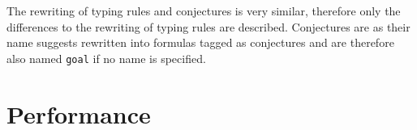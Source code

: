 The rewriting of typing rules and conjectures is very similar,
therefore only the differences to the rewriting of typing rules are
described. Conjectures are as their name suggests rewritten into
formulas tagged as conjectures and are therefore also named
\texttt{goal} if no name is specified. 

\section{Performance}





